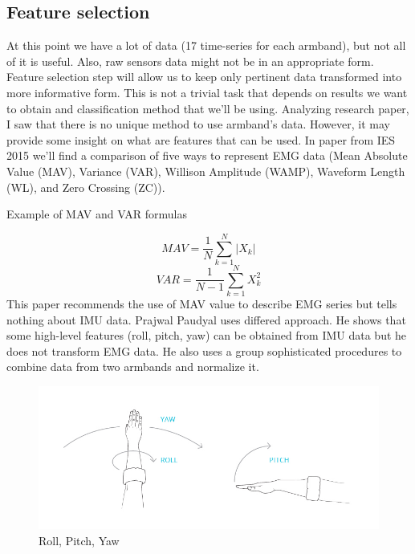 \documentclass[conference,compsoc]{IEEEtran}
\begin{document}
\subsection{Feature selection}
At this point we have a lot of data (17 time-series for each armband), but not all of it is useful. Also, raw sensors data might not be in an appropriate form. Feature selection step will allow us to keep only pertinent data transformed into more informative form.  This is not a trivial task that depends on results we want to obtain and classification method that we’ll be using. Analyzing research paper, I saw that there is no unique method to use armband’s data. However, it may provide some insight on what are features that can be used. In paper from IES 2015 \cite{time_series_comparison} we’ll find a comparison of five ways to represent EMG data (Mean Absolute Value (MAV), Variance (VAR), Willison Amplitude (WAMP), Waveform Length (WL), and Zero Crossing (ZC)). 
\begin{center}
Example of MAV and VAR formulas
\end{center}
\begin{equation}
MAV = \frac{1}{N}\sum_{k=1}^{N}|X_k|
\end{equation}
\begin{equation}
VAR = \frac{1}{N-1}\sum_{k=1}^{N}X_k^2
\end{equation}
This paper recommends the use of MAV value to describe EMG series but tells nothing about IMU data. Prajwal Paudyal\cite{spectre} uses differed approach. He shows that some high-level features (roll, pitch, yaw) can be obtained from IMU data but he does not transform EMG data. He also uses a group sophisticated procedures to combine data from two armbands and normalize it.

\begin{figure}[h]
\caption{Roll, Pitch, Yaw}
\includegraphics[scale=0.30]{yawetc}
\centering
\end{figure}
\end{document}

